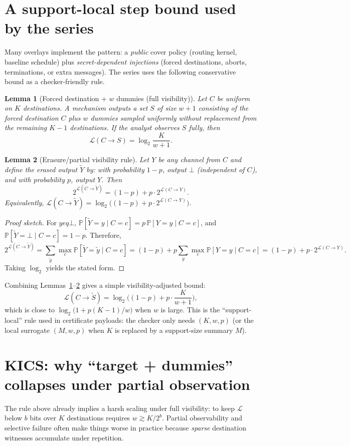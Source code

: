 \documentclass[11pt]{article}
\newcommand{\Prb}{\mathbb{P}}
\newcommand{\MaxL}{\mathcal{L}}
\newcommand{\logtwo}{\log_2}
\newtheorem{lemma}{Lemma}
\begin{document}
\section{A support-local step bound used by the series}\label{sec:supportlocal}
Many overlays implement the pattern:
a \emph{public} cover policy (routing kernel, baseline schedule) plus \emph{secret-dependent injections} (forced destinations, aborts, terminations, or extra messages).
The series uses the following conservative bound as a checker-friendly rule.

\begin{lemma}[Forced destination + $w$ dummies (full visibility)]\label{lem:forced_dest_full}
Let $C$ be uniform on $K$ destinations.
A mechanism outputs a set $S$ of size $w{+}1$ consisting of the forced destination $C$ plus $w$ dummies sampled uniformly without replacement from the remaining $K{-}1$ destinations.
If the analyst observes $S$ fully, then
\[
\MaxL(C\!\to\!S)=\logtwo\frac{K}{w+1}.
\]
\end{lemma}

\begin{lemma}[Erasure/partial visibility rule]\label{lem:erasure}
Let $Y$ be any channel from $C$ and define the \emph{erased} output $\tilde Y$ by:
with probability $1-p$, output $\bot$ (independent of $C$), and with probability $p$, output $Y$.
Then
\[
2^{\MaxL(C\to \tilde Y)} = (1-p) + p\cdot 2^{\MaxL(C\to Y)}.
\]
Equivalently, $\MaxL(C\to \tilde Y)=\logtwo\!\big((1-p)+p\cdot 2^{\MaxL(C\to Y)}\big)$.
\end{lemma}

\begin{proof}[Proof sketch]
For $yeq\bot$, $\Prb[\tilde Y=y\mid C=c]=p\,\Prb[Y=y\mid C=c]$, and $\Prb[\tilde Y=\bot\mid C=c]=1-p$. Therefore,
\[
2^{\MaxL(C\to \tilde Y)}=\sum_{\tilde y}\max_c \Prb[\tilde Y=\tilde y\mid C=c]
=(1-p)+p\sum_{y}\max_c \Prb[Y=y\mid C=c]
=(1-p)+p\cdot 2^{\MaxL(C\to Y)}.
\]
Taking $\logtwo$ yields the stated form.
\end{proof}

Combining Lemmas~\ref{lem:forced_dest_full}--\ref{lem:erasure} gives a simple visibility-adjusted bound:
\[
\MaxL(C\!\to\!\tilde S)=\logtwo\!\Big((1-p)+p\cdot \frac{K}{w+1}\Big),
\]
which is close to $\logtwo\!\big(1+p(K-1)/w\big)$ when $w$ is large.
This is the ``support-local'' rule used in certificate payloads: the checker only needs $(K,w,p)$ (or the local surrogate $(M,w,p)$ when $K$ is replaced by a support-size summary $M$).

\section{KICS: why ``target + dummies'' collapses under partial observation}\label{sec:kics}
The rule above already implies a harsh scaling under full visibility: to keep $\MaxL$ below $b$ bits over $K$ destinations requires $w \gtrsim K/2^b$.
Partial observability and selective failure often make things worse in practice because \emph{sparse} destination witnesses accumulate under repetition.
\end{document}
